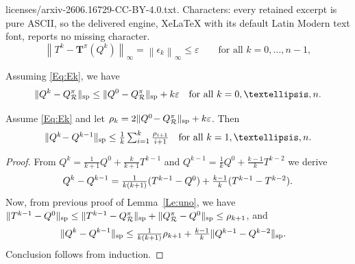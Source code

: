 \documentclass[10pt,a4paper]{amsart}
\newcommand*{\infn}[1]{\left\|{#1}\right\|_{\infty}}
\newcommand{\T}{\mathbf{T}}
\newcommand{\cR}{\mathcal{R}}
\renewcommand{\sp}[1]{\|{#1}\|_\text{\rm sp}}
\begin{document}
licenses/arxiv-2606.16729-CC-BY-4.0.txt. Characters: every retained excerpt is pure ASCII, so the delivered engine, XeLaTeX with its default Latin Modern text font, reports no missing character.
\begin{equation}\label{Eq:Ek}
\infn{T^k-\T^\pi(Q^{k})} =\infn{\epsilon_k}\le \varepsilon\qquad \text{for all} \,\, k=0,\ldots,n-1,
\end{equation}

\begin{lemma}\label{Le:uno}Assuming \eqref{Eq:Ek}, we have  $$\sp{Q^k-Q^\pi_\cR}\leq \sp{Q^0-Q^\pi_\cR}+ k \varepsilon \quad \text{for all} \,\, k=0,\ldots,n.$$ 
\end{lemma}

\begin{lemma}\label{Le:dos} Assume \eqref{Eq:Ek} and let $\rho_k=2\sp{Q^0\!-Q^\pi_\cR}+k\varepsilon$. Then 
$$\mbox{$\sp{Q^{k}\!-Q^{k-1}} \le \frac{1}{k}\sum_{i=1}^{k}\frac{\rho_{i+1}}{i+1}\quad \text{for all} \,\, k=1,\ldots,n.$}$$ 
\end{lemma}

\begin{proof} From 
$Q^{k}=\frac{1}{k+1}Q^0+\frac{k}{k+1}T^{k-1}$ and
$Q^{k-1}=\frac{1}{k}Q^0+\frac{k-1}{k}T^{k-2}$
we derive
\begin{equation*} \label{eq:aux}
    Q^{k}-Q^{k-1}
    =\mbox{$ \frac{1}{k(k+1)}(T^{k-1}-Q^0) + \frac{k-1}{k}(T^{k-1}-T^{k-2})$}.
\end{equation*}
Now, from previous proof of Lemma~\ref{Le:uno}, we have $\sp{T^{k-1}-Q^0}\leq \sp{T^{k-1}-Q^\pi_\cR} +\sp{Q^\pi_\cR-Q^0}\leq\rho_{k+1}$,  
and
\begin{align*}
    \sp{Q^{k}-Q^{k-1}} 
    &\le \mbox{$\frac{1}{k(k+1)}\rho_{k+1} +  \frac{k-1}{k}\sp{Q^{k-1}- Q^{k-2}}$}.
\end{align*}
Conclusion follows from induction.
\end{proof}
\end{document}
